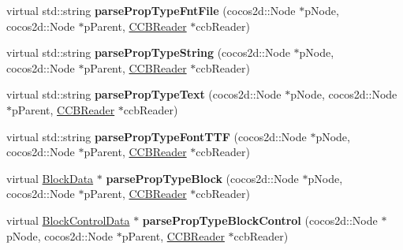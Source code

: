 \begin{DoxyCompactItemize}
\mbox{\label{classcocosbuilder_1_1NodeLoader_a602188e75389f8fbf3e718ff4c00d17d}} 
virtual std\+::string {\bfseries parse\+Prop\+Type\+Fnt\+File} (cocos2d\+::\+Node $\ast$p\+Node, cocos2d\+::\+Node $\ast$p\+Parent, \hyperlink{classcocosbuilder_1_1CCBReader}{C\+C\+B\+Reader} $\ast$ccb\+Reader)
\item 
\mbox{\label{classcocosbuilder_1_1NodeLoader_a9bdaf4132ce6fa39bacda05a89e09b48}} 
virtual std\+::string {\bfseries parse\+Prop\+Type\+String} (cocos2d\+::\+Node $\ast$p\+Node, cocos2d\+::\+Node $\ast$p\+Parent, \hyperlink{classcocosbuilder_1_1CCBReader}{C\+C\+B\+Reader} $\ast$ccb\+Reader)
\item 
\mbox{\label{classcocosbuilder_1_1NodeLoader_a7f391193726cac3b8571e054be2a2a92}} 
virtual std\+::string {\bfseries parse\+Prop\+Type\+Text} (cocos2d\+::\+Node $\ast$p\+Node, cocos2d\+::\+Node $\ast$p\+Parent, \hyperlink{classcocosbuilder_1_1CCBReader}{C\+C\+B\+Reader} $\ast$ccb\+Reader)
\item 
\mbox{\label{classcocosbuilder_1_1NodeLoader_aa34ccc740f80e9a05e0d8c1d079139c4}} 
virtual std\+::string {\bfseries parse\+Prop\+Type\+Font\+T\+TF} (cocos2d\+::\+Node $\ast$p\+Node, cocos2d\+::\+Node $\ast$p\+Parent, \hyperlink{classcocosbuilder_1_1CCBReader}{C\+C\+B\+Reader} $\ast$ccb\+Reader)
\item 
\mbox{\label{classcocosbuilder_1_1NodeLoader_a1ff795b3ab8ff3952acad7e6d21e2b31}} 
virtual \hyperlink{structcocosbuilder_1_1BlockData}{Block\+Data} $\ast$ {\bfseries parse\+Prop\+Type\+Block} (cocos2d\+::\+Node $\ast$p\+Node, cocos2d\+::\+Node $\ast$p\+Parent, \hyperlink{classcocosbuilder_1_1CCBReader}{C\+C\+B\+Reader} $\ast$ccb\+Reader)
\item 
\mbox{\label{classcocosbuilder_1_1NodeLoader_a74959b2f38e7a0287ee0da33445c4284}} 
virtual \hyperlink{structcocosbuilder_1_1BlockControlData}{Block\+Control\+Data} $\ast$ {\bfseries parse\+Prop\+Type\+Block\+Control} (cocos2d\+::\+Node $\ast$p\+Node, cocos2d\+::\+Node $\ast$p\+Parent, \hyperlink{classcocosbuilder_1_1CCBReader}{C\+C\+B\+Reader} $\ast$ccb\+Reader)
\item 

\end{DoxyCompactItemize}
